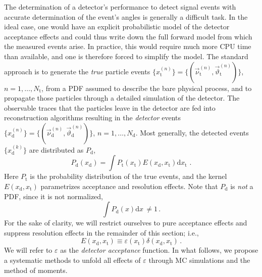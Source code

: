 \documentclass[aps,prd,reprint,nofootinbib,preprintnumbers]{revtex4}
\newcommand{\rmdx}[1]{\mbox{d} #1 \,} %
\renewcommand{\theta}{\vartheta}
\let\eps\varepsilon
\begin{document}
The determination of a detector's performance to detect signal events
with accurate determination of the event's angles is generally a difficult
task. In the ideal case, one would have an explicit probabilistic model of
the detector acceptance effects and could thus write down the full
forward model from which the measured events arise. In practice, this
would require much more CPU time than available, and one is therefore
forced to simplify the model. The standard approach is to generate
the \emph{true} particle events $\lbrace x_\text{t}^{(n)}\rbrace =
\lbrace(\vec{\nu}^{(n)}_\text{t},\vec\theta^{(n)}_\text{t})\rbrace$, $n=1,\dots,N_\text{t}$, from a PDF
assumed to describe the bare physical process, and to propagate those
particles through a detailed simulation of the detector.
The observable traces that the particles leave in the detector are fed
into reconstruction algorithms resulting in the \emph{detector} events
$\lbrace x^{(n)}_\text{d}\rbrace = \lbrace(\vec{\nu}^{(n)}_\text{d},
\vec\theta^{(n)}_\text{d})\rbrace$, $n=1,\dots,N_\text{d}$.
Most generally, the detected events $\lbrace x_\text{d}^{(k)}\rbrace$
are distributed as $P_\text{d}$,
\begin{equation}
    P_\text{d}(x_\text{d}) = \int P_\text{t}(x_\text{t}) E(x_\text{d}, x_\text{t}) \rmdx{x_\text{t}}\,.
\end{equation}
Here $P_\text{t}$ is the probability distribution of the true events, and the kernel $E(x_\text{d}, x_\text{t})$
parametrizes acceptance and resolution
effects. Note that $P_\text{d}$ is \emph{not} a PDF, since it is not normalized,
\begin{equation}
    \int P_\text{d}(x) \rmdx{x} \neq 1\,.
\end{equation}
For the sake of clarity, we will restrict ourselves
to pure acceptance effects and suppress resolution effects in the remainder of this section; i.e.,
\begin{equation}
    E(x_\text{d}, x_\text{t}) \equiv \eps(x_\text{t}) \delta(x_\text{d}, x_\text{t})\,.
\end{equation}
We will refer to $\eps$ as the \emph{detector acceptance} function. In what follows,
we propose a systematic methods to unfold all effects of $\eps$ through MC simulations
and the method of moments.\\
\end{document}
